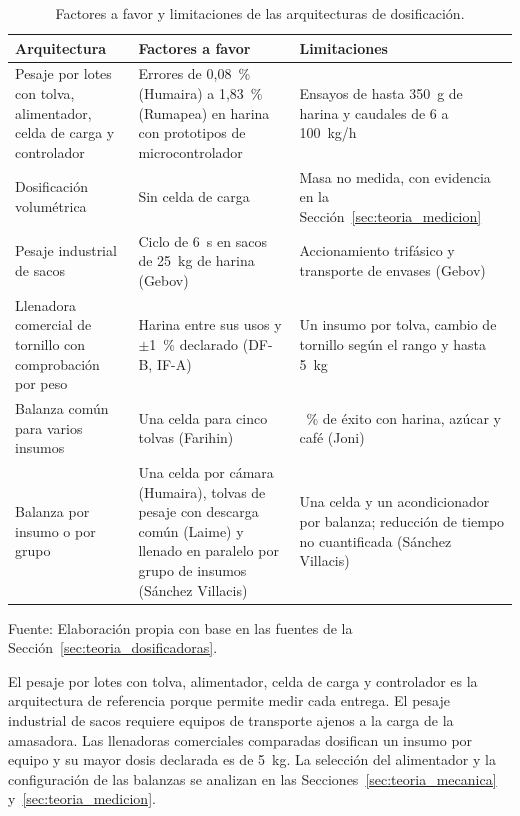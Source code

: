 \begin{table}[H]
    \centering
    \caption{Factores a favor y limitaciones de las arquitecturas de dosificación.}
    \label{tab:dosificadoras_enfoques}
    \footnotesize
    \setlength{\tabcolsep}{3pt}
    \renewcommand{\arraystretch}{1.25}

    \begin{tabularx}{\textwidth}{
        >{\raggedright\arraybackslash}p{}
        >{\raggedright\arraybackslash}X
        >{\raggedright\arraybackslash}X}
        \toprule[1pt]
        \textbf{Arquitectura} & \textbf{Factores a favor} & \textbf{Limitaciones} \\
        \midrule[1pt]
        Pesaje por lotes con tolva, alimentador, celda de carga y controlador &
        Errores de 0,08~\% (Humaira) a 1,83~\% (Rumapea) en harina con
        prototipos de microcontrolador & Ensayos de hasta 350~g de harina y caudales de 6 a
        100~kg/h \\
        Dosificación volumétrica & Sin celda de carga & Masa no medida, con
        evidencia en la Sección~\ref{sec:teoria_medicion} \\
        Pesaje industrial de sacos & Ciclo de 6~s en sacos de 25~kg
        de harina (Gebov) & Accionamiento trifásico y transporte de
        envases (Gebov) \\
        Llenadora comercial de tornillo con comprobación por peso & Harina
        entre sus usos y $\pm$1~\% declarado (DF-B, IF-A) & Un insumo por tolva,
        cambio de tornillo según el rango y hasta 5~kg \\
        Balanza común para varios insumos & Una celda para cinco tolvas
        (Farihin) & 70~\% de éxito con harina, azúcar y café (Joni) \\
        Balanza por insumo o por grupo & Una celda por cámara (Humaira),
        tolvas de pesaje con descarga común (Laime) y llenado en paralelo por grupo de insumos
        (Sánchez Villacis) & Una celda y un acondicionador por balanza;
        reducción de tiempo no cuantificada (Sánchez Villacis) \\
        \bottomrule[1pt]
    \end{tabularx}

    \vspace{2pt}
    {\footnotesize Fuente: Elaboración propia con base en las fuentes de la
    Sección~\ref{sec:teoria_dosificadoras}.}
\end{table}

El pesaje por lotes con tolva, alimentador, celda de carga y controlador
es la arquitectura de referencia porque permite medir cada entrega. El
pesaje industrial de sacos requiere equipos de transporte ajenos a la
carga de la amasadora. Las llenadoras comerciales comparadas dosifican
un insumo por equipo y su mayor dosis declarada es de 5~kg. La selección del
alimentador y la configuración de las balanzas se analizan en las
Secciones~\ref{sec:teoria_mecanica} y~\ref{sec:teoria_medicion}.

